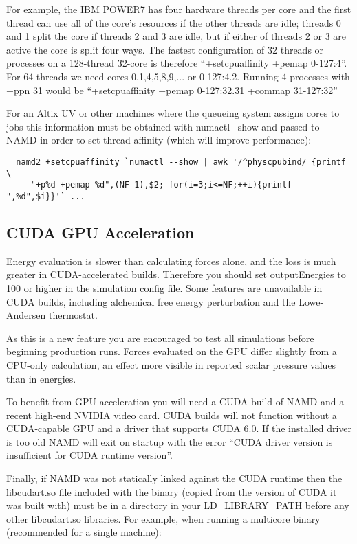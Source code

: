 For example, the IBM POWER7 has four hardware threads per core and the
first thread can use all of the core's resources if the other threads are
idle; threads 0 and 1 split the core if threads 2 and 3 are idle, but
if either of threads 2 or 3 are active the core is split four ways.  The
fastest configuration of 32 threads or processes on a 128-thread 32-core
is therefore ``+setcpuaffinity +pemap 0-127:4''.  For 64 threads we need
cores 0,1,4,5,8,9,... or 0-127:4.2.  Running 4 processes with +ppn 31
would be ``+setcpuaffinity +pemap 0-127:32.31 +commap 31-127:32''

For an Altix UV or other machines where the queueing system assigns cores
to jobs this information must be obtained with numactl --show and passed
to NAMD in order to set thread affinity (which will improve performance):

\begin{verbatim}
  namd2 +setcpuaffinity `numactl --show | awk '/^physcpubind/ {printf \
     "+p%d +pemap %d",(NF-1),$2; for(i=3;i<=NF;++i){printf ",%d",$i}}'` ...
\end{verbatim}

\subsection{CUDA GPU Acceleration}

Energy evaluation is slower than calculating forces alone, and the loss
is much greater in CUDA-accelerated builds.  Therefore you should set
outputEnergies to 100 or higher in the simulation config file.  Some
features are unavailable in CUDA builds, including alchemical free
energy perturbation and the {Lowe-Andersen} thermostat.

As this is a new feature you are encouraged to test all simulations
before beginning production runs.  Forces evaluated on the GPU differ
slightly from a CPU-only calculation, an effect more visible in reported
scalar pressure values than in energies.

To benefit from GPU acceleration you will need a CUDA build of NAMD
and a recent high-end NVIDIA video card.  CUDA builds will not function
without a CUDA-capable GPU and a driver that supports CUDA 6.0.  If the
installed driver is too old NAMD will exit on startup with the error
``CUDA driver version is insufficient for CUDA runtime version''.

Finally, if NAMD was not statically linked against the CUDA runtime
then the libcudart.so file included with the binary (copied from
the version of CUDA it was built with) must be in a directory in your
LD\_LIBRARY\_PATH before any other libcudart.so libraries.  For example,
when running a multicore binary (recommended for a single machine):

